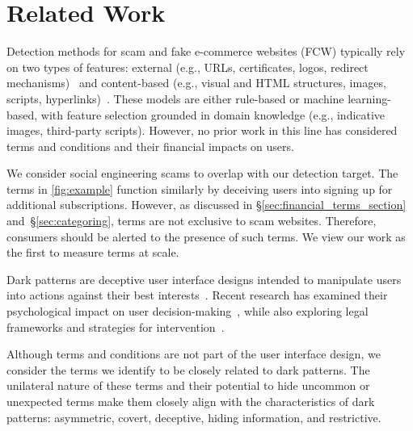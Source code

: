 \section{Related Work}


Detection methods for scam and fake e-commerce websites (FCW) typically rely on two types of features: external (e.g., URLs, certificates, logos, redirect mechanisms)~\citep{blum2010lexical, zouina2017novel, moghimi2016new, sakurai2020discovering, drury2019certified, van2022logomotive, li2018fake, zhang2014you, zheng2017smoke, sahingoz2019machine, bitaab2023beyond} and content-based (e.g., visual and HTML structures, images, scripts, hyperlinks)~\citep{xiang2011cantina+, kharraz2018surveylance, yang2019phishing, jain2017phishing, bitaab2023beyond, yang2023trident}. These models are either rule-based or machine learning-based, with feature selection grounded in domain knowledge (e.g., indicative images, third-party scripts). However, no prior work in this line has considered terms and conditions and their financial impacts on users.


We consider social engineering scams to overlap with our detection target. The \termname terms in \autoref{fig:example} function similarly by deceiving users into signing up for additional subscriptions. However, as discussed in \S\ref{sec:financial_terms_section} and~\S\ref{sec:categoring}, \termname terms are not exclusive to scam websites. Therefore, consumers should be alerted to the presence of such terms. We view our work as the first to measure \termname terms at scale.



Dark patterns are deceptive user interface designs intended to manipulate users into actions against their best interests~\citep{mathur2019dark}. Recent research has examined their psychological impact on user decision-making~\citep{mathur2021makes,nouwens2020dark,waldman2020cognitive,narayanan2020dark}, while also exploring legal frameworks and strategies for intervention~\citep{luguri2021shining,gray2021dark}.

Although terms and conditions are not part of the user interface design, we consider the \termname terms we identify to be closely related to dark patterns. The unilateral nature of these terms and their potential to hide uncommon or unexpected terms make them closely align with the characteristics of dark patterns: asymmetric, covert, deceptive, hiding information, and restrictive.



